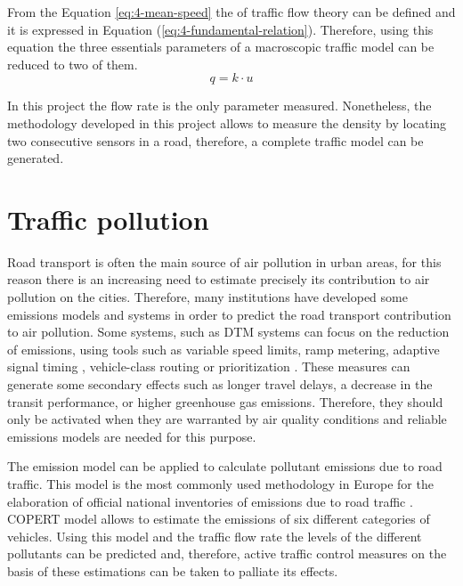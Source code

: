 \newpage
From the Equation \ref{eq:4-mean-speed} the  of traffic flow theory can be defined and it is expressed in Equation (\ref{eq:4-fundamental-relation}). Therefore, using this equation the three essentials parameters of a macroscopic traffic model can be reduced to two of them.
\begin{equation} \label{eq:4-fundamental-relation}
q = k \cdot u
\end{equation}

In this project the flow rate is the only parameter measured. Nonetheless, the methodology developed in this project allows to measure the density by locating two consecutive sensors in a road, therefore, a complete traffic model can be generated.


\section{Traffic pollution}

Road transport is often the main source of air pollution in urban areas, for this reason there is an increasing need to estimate precisely its contribution to air pollution on the cities. Therefore, many institutions have developed some emissions models and systems in order to predict the road transport contribution to air pollution. Some systems, such as \ac{DTM} systems can focus on the reduction of emissions, using tools such as variable speed limits, ramp metering, adaptive signal timing \cite{MK10}, vehicle-class routing or prioritization \cite{ZDHB09}. These measures can generate some secondary effects such as longer travel delays, a decrease in the transit performance, or higher greenhouse gas emissions. Therefore, they should only be activated when they are warranted by air quality conditions \cite{EMA09} and reliable emissions models are needed for this purpose. 

The  emission model \cite{NS16} can be applied to calculate pollutant emissions due to road traffic. This model is the most commonly used methodology in Europe for the elaboration of official national inventories of emissions due to road traffic \cite{Zaldei2017531}. COPERT model allows to estimate the emissions of six different categories of vehicles. Using this model and the traffic flow rate the levels of the different pollutants can be predicted and, therefore, active traffic control measures on the basis of these estimations can be taken to palliate its effects.

